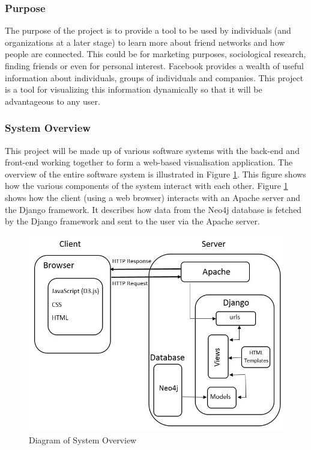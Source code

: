 \documentclass[12pt,onecolumn]{article}
\begin{document}
	\subsubsection{Purpose}
	The purpose of the project is to provide a tool to be used by individuals (and organizations at a later stage) to learn more about friend networks and how people are connected. This could be for marketing purposes, sociological research, finding friends or even for personal  interest. Facebook provides a wealth of useful information about individuals, groups of individuals and companies. This project is a tool for visualizing this information dynamically so that it will be advantageous to any  user.
	
	\subsubsection{System Overview}
	This project will be made up of various software systems with the back-end and front-end working together to form a web-based visualisation application. The overview of the entire software system is illustrated in Figure \ref{system}. This figure shows how the various components of the system interact with each other. Figure \ref{system} shows how the client (using a web browser) interacts with an Apache server and the Django framework. It describes how data from the Neo4j database is fetched by the Django framework and sent to the user via the Apache server.
	
	\begin{figure}[h]
		\centering
		\includegraphics[width=\textwidth]{system}
		\caption{Diagram of System Overview}
		\label{system}
	\end{figure}
	
\end{document}
